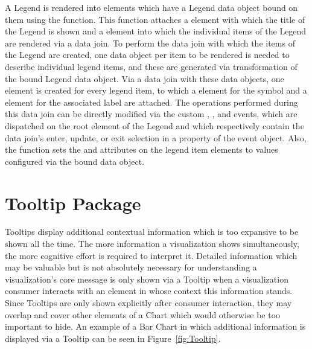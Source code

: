 A Legend is rendered into elements which have a Legend data object
bound on them using the  function. This function
attaches a  element with which the title of the Legend
is shown and a  element into which the individual items of
the Legend are rendered via a data join. To perform the data join with
which the items of the Legend are created, one  data
object per item to be rendered is needed to describe individual legend
items, and these are generated via transformation of the bound Legend
data object. Via a data join with these data objects, one 
element is created for every legend item, to which a 
element for the symbol and a  element for the
associated label are attached. The operations performed during this
data join can be directly modified via the custom ,
, and  events, which are dispatched on the
root element of the Legend and which respectively contain the data
join's enter, update, or exit selection in a property of the event
object. Also, the  function sets the
 and  attributes on the legend
item elements to values configured via the bound data object.






\section{Tooltip Package}
\label{sec:TooltipPackage}

Tooltips display additional contextual information which is too
expansive to be shown all the time. The more information a
visualization shows simultaneously, the more cognitive effort is
required to interpret it. Detailed information which may be valuable
but is not absolutely necessary for understanding a visualization's
core message is only shown via a Tooltip when a visualization consumer
interacts with an element in whose context this information stands.
Since Tooltips are only shown explicitly after consumer interaction, they
may overlap and cover other elements of a Chart which would otherwise
be too important to hide. An example of a Bar Chart in which
additional information is displayed via a Tooltip can be seen in
Figure~\ref{fig:Tooltip}.


